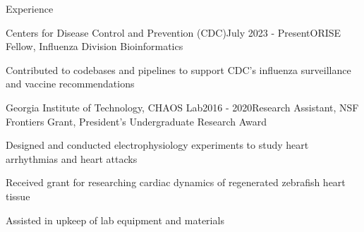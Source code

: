 \documentclass{resume} %
\begin{document}
\begin{rSection}{Experience}

\begin{rSubsection}{Centers for Disease Control and Prevention (CDC)}{July 2023 - Present}{ORISE Fellow, Influenza Division Bioinformatics}{}
\item Contributed to codebases and pipelines to support CDC's influenza surveillance and vaccine recommendations
\end{rSubsection}


\begin{rSubsection}{Georgia Institute of Technology, CHAOS Lab}{2016 - 2020}{Research Assistant, NSF Frontiers Grant, President's Undergraduate Research Award}{}
\item Designed and conducted electrophysiology  experiments to study heart arrhythmias and heart attacks
\item Received grant for researching cardiac dynamics of regenerated zebrafish heart tissue
\item Assisted in upkeep of lab equipment and materials
\end{rSubsection}




\end{rSection}
\end{document}
